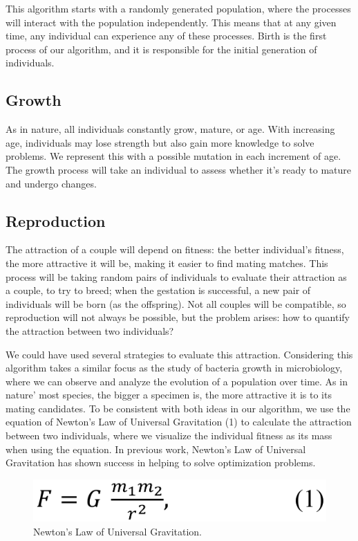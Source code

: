 \documentclass[runningheads]{llncs}
\begin{document}
This algorithm starts with a randomly generated population, where the processes
will interact with the population independently. This means that at any given
time, any individual can experience any of these processes. Birth is the first
process of our algorithm, and it is responsible for the initial generation of
individuals.

\subsection{Growth}

As in nature, all individuals constantly grow, mature, or age. With increasing
age, individuals may lose strength but also gain more knowledge to solve
problems. We represent this with a possible mutation in each increment of age.
The growth process will take an individual to assess whether it's ready to
mature and undergo changes.

\subsection{Reproduction}

The attraction of a couple will depend on fitness: the better individual's
fitness, the more attractive it will be, making it easier to find mating
matches. This process will be taking random pairs of individuals to evaluate
their attraction as a couple, to try to breed; when the gestation is
successful, a new pair of individuals will be born (as the offspring). Not all
couples will be compatible, so reproduction will not always be possible, but
the problem arises: how to quantify the attraction between two individuals?

We could have used several strategies to evaluate this attraction. Considering
this algorithm takes a similar focus as the study of bacteria growth in
microbiology, where we can observe and analyze the evolution of a population
over time. As in nature' most species, the bigger a specimen is, the more
attractive it is to its mating candidates. To be consistent with both ideas in
our algorithm, we use the equation of Newton's Law of Universal Gravitation (1)
to calculate the attraction between two individuals, where we visualize the
individual fitness as its mass when using the equation. In previous work,
Newton's Law of Universal Gravitation has shown success in helping to solve
optimization problems.

\begin{figure}
    \includegraphics[width=\textwidth]{img/fig3_newtonslaw.pdf}
    \caption{Newton's Law of Universal Gravitation.} \label{fig3}
    \end{figure}
\end{document}
